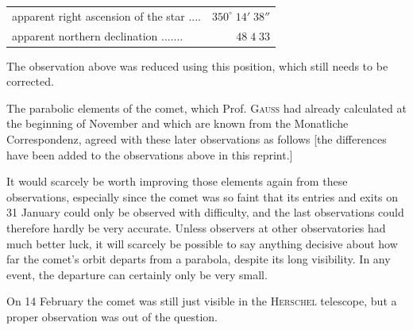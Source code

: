 \begin{center}\fontsize{10}{12}\selectfont\setlength{\tabcolsep}{2pt}\renewcommand{\arraystretch}{1.15}\begin{tabular}{lr}
apparent right ascension of the star .\;.\;.\;.\; & $350^\circ\;14'\;38''$\\
apparent northern declination .\;.\;.\;.\;.\;.\;.\; & $48\;4\;33$\\
\end{tabular}\end{center}

\noindent The observation above was reduced using this position, which still needs to be corrected.

\par\indent The parabolic elements of the comet, which Prof. \textsc{Gauss} had already calculated at the beginning of November and which are known from the Monatliche Correspondenz, agreed with these later observations as follows [the differences have been added to the observations above in this reprint.]

\par\indent It would scarcely be worth improving those elements again from these observations, especially since the comet was so faint that its entries and exits on 31 January could only be observed with difficulty, and the last observations could therefore hardly be very accurate. Unless observers at other observatories had much better luck, it will scarcely be possible to say anything decisive about how far the comet’s orbit departs from a parabola, despite its long visibility. In any event, the departure can certainly only be very small.

\par\indent On 14 February the comet was still just visible in the \textsc{Herschel} telescope, but a proper observation was out of the question.
